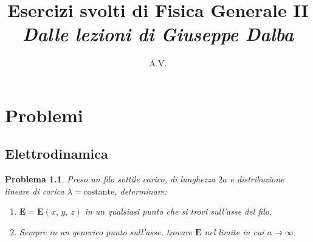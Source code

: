 \documentclass[b5paper,twoside]{book}
\author{A.V.}
\title{Esercizi svolti di Fisica Generale II\\
	\large{\textit{Dalle lezioni di Giuseppe Dalba}}}
\newtheorem{problema}{Problema}
\renewcommand{\vec}[1]{\mathbf{#1}}
\begin{document}
\maketitle

\tableofcontents

\chapter{Problemi}
\section{Elettrodinamica}

\begin{problema}
	Preso un filo sottile carico, di lunghezza $2a$ e 
	distribuzione lineare di carica $\lambda = \mathrm{costante}$, 
	determinare:
	\begin{enumerate}
		\item $\vec{E} = \vec{E}(x,\,y,\,z)$ in un qualsiasi punto 
		che si trovi sull'asse del filo.
		\item Sempre in un generico punto sull'asse, trovare $\vec{E}$ 
		nel limite in cui $a \longrightarrow \infty$.
	\end{enumerate}
\end{problema}
\end{document}
